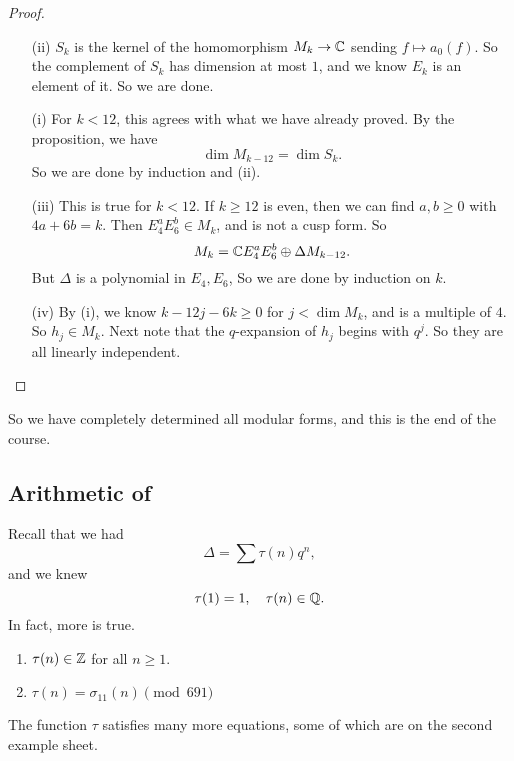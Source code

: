 \documentclass[a4paper]{article}
\begin{document}
\begin{proof}\leavevmode
  \begin{enumerate}
    \item[(ii)] $S_k$ is the kernel of the homomorphism $M_k \to \mathbb{C}$ sending $f \mapsto a_0(f)$. So the complement of $S_k$ has dimension at most $1$, and we know $E_k$ is an element of it. So we are done.
    \item[(i)] For $k < 12$, this agrees with what we have already proved. By the proposition, we have
      \[
        \dim M_{k - 12} = \dim S_k.
      \]
      So we are done by induction and (ii).
    \item[(iii)] This is true for $k < 12$. If $k \geq 12$ is even, then we can find $a, b \geq 0$ with $4a + 6b = k$. Then $E_4^a E_6^b \in M_k$, and is not a cusp form. So
      \[
        M_k = \mathbb{C} E_4^a E_6^b \oplus \Delta M_{k - 12}.
      \]
      But $\Delta$ is a polynomial in $E_4, E_6$, So we are done by induction on $k$.
    \item[(iv)] By (i), we know $k - 12j - 6k \geq 0$ for $j < \dim M_k$, and is a multiple of $4$. So $h_j \in M_k$. Next note that the $q$-expansion of $h_j$ begins with $q^j$. So they are all linearly independent.\qedhere
  \end{enumerate}
\end{proof}
So we have completely determined all modular forms, and this is the end of the course.

\newpage
\subsection{Arithmetic of }
Recall that we had
\[
  \Delta = \sum \tau(n) q^n,
\]
and we knew
\[
  \tau(1) = 1,\quad \tau(n) \in \mathbb{Q}.
\]
In fact, more is true.
\begin{prop}\leavevmode
  \begin{enumerate}
    \item $\tau(n) \in \mathbb{Z}$ for all $n \geq 1$.
    \item $\tau(n) = \sigma_{11}(n) \pmod {691}$
  \end{enumerate}
\end{prop}
The function $\tau$ satisfies many more equations, some of which are on the second example sheet.
\end{document}
